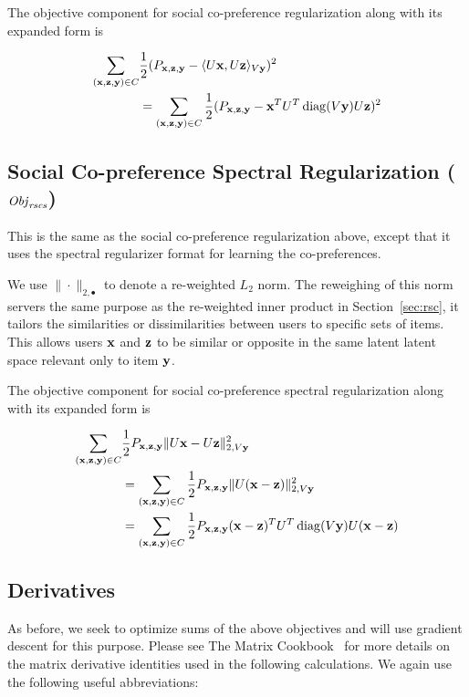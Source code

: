 The objective component for 
social co-preference regularization along with its expanded form is

\begin{align}
\sum_{(\mathbf{x},\mathbf{z},\mathbf{y}) \in C} & \frac{1}{2} (P_{\mathbf{x},\mathbf{z},\mathbf{y}} - \langle U\mathbf{x}, U\mathbf{z} \rangle_{V\mathbf{y}})^2 \nonumber \\
& = \sum_{(\mathbf{x},\mathbf{z},\mathbf{y}) \in C} \frac{1}{2} (P_{\mathbf{x},\mathbf{z},\mathbf{y}} - \mathbf{x}^T U^T \operatorname{diag}(V\mathbf{y}) U \mathbf{z})^2
\end{align}


\subsection{Social Co-preference Spectral Regularization ($\mathit{Obj}_{\mathit{rscs}}$)}
This is the same as the social co-preference regularization above, except that it uses the spectral regularizer format for 
learning the co-preferences.

 We use $\| \cdot \|_{2,\bullet}$ to denote a re-weighted $L_2$ norm. The reweighing of this norm servers the same purpose as the re-weighted inner product in Section~\ref{sec:rsc}, it tailors the similarities or dissimilarities between users to specific sets of items. This allows users $\mathbf{x}$
and $\mathbf{z}$ to be similar or opposite in the same latent latent space
relevant only to item $\mathbf{y}$.  
 
 The objective component for
 social co-preference spectral regularization along with its expanded form is
 
\begin{align}
\sum_{(\mathbf{x},\mathbf{z},\mathbf{y}) \in C} & \frac{1}{2} P_{\mathbf{x},\mathbf{z},\mathbf{y}} \| U\mathbf{x} - U\mathbf{z} \|_{2,V\mathbf{y}}^2 \nonumber \\
& = \sum_{(\mathbf{x},\mathbf{z},\mathbf{y}) \in C} \frac{1}{2} P_{\mathbf{x},\mathbf{z},\mathbf{y}} \| U (\mathbf{x} - \mathbf{z}) \|_{2,V\mathbf{y}}^2 \nonumber \\
& = \sum_{(\mathbf{x},\mathbf{z},\mathbf{y}) \in C} \frac{1}{2} P_{\mathbf{x},\mathbf{z},\mathbf{y}} (\mathbf{x} - \mathbf{z})^T U^T \operatorname{diag}(V\mathbf{y}) U (\mathbf{x} - \mathbf{z})
\end{align}

\subsection{Derivatives}
As before, we seek to optimize sums of the above objectives and will use
gradient descent for this purpose. Please see The Matrix Cookbook~\cite{matrix} for more details on the matrix derivative identities used in the following calculations.
We again use the following useful abbreviations:

